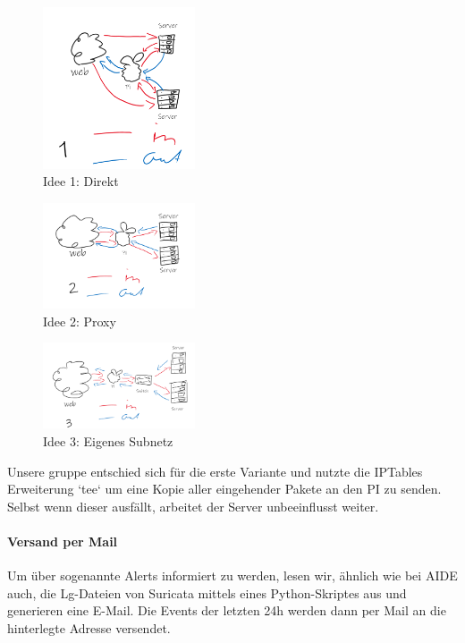 \documentclass{article}
\begin{document}
\begin{figure}[h]
    \centering
    \includegraphics[width=0.4\textwidth]{assets/Idee1.2.png}
    \caption{\label{fig:Idee1}Idee 1: Direkt}
\end{figure}

\begin{figure}[h]
    \centering
    \includegraphics[width=0.4\textwidth]{assets/Idee2.png}
    \caption{\label{fig:Idee2}Idee 2: Proxy}
\end{figure}

\begin{figure}[h]
    \centering
    \includegraphics[width=0.4\textwidth]{assets/Idee3.png}
    \caption{\label{fig:Idee3}Idee 3: Eigenes Subnetz}
\end{figure}

\vfil \break
Unsere gruppe entschied sich für die erste Variante und nutzte die IPTables Erweiterung `tee` um eine Kopie aller eingehender Pakete an den PI zu senden. Selbst wenn dieser ausfällt, arbeitet der Server unbeeinflusst weiter.

\paragraph{Versand per Mail}
Um über sogenannte Alerts informiert zu werden, lesen wir, ähnlich wie bei AIDE auch, die Lg-Dateien von Suricata mittels eines Python-Skriptes aus und generieren eine E-Mail.
Die Events der letzten 24h werden dann per Mail an die hinterlegte Adresse versendet.
\end{document}
